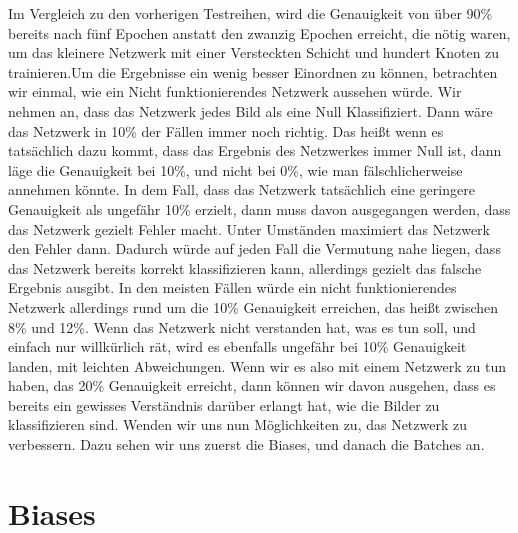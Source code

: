 \documentclass[12pt]{article}
\begin{document}
Im Vergleich zu den vorherigen Testreihen, wird die Genauigkeit von über 90\% bereits nach fünf Epochen anstatt den zwanzig Epochen erreicht, die nötig waren, um das kleinere Netzwerk mit einer Versteckten Schicht und hundert Knoten zu trainieren.Um die Ergebnisse ein wenig besser Einordnen zu können, betrachten wir einmal, wie ein Nicht funktionierendes Netzwerk aussehen würde. Wir nehmen an, dass das Netzwerk jedes Bild als eine Null Klassifiziert. Dann wäre das Netzwerk in 10\% der Fällen immer noch richtig. Das heißt wenn es tatsächlich dazu kommt, dass das Ergebnis des Netzwerkes immer Null ist, dann läge die Genauigkeit bei 10\%, und nicht bei 0\%, wie man fälschlicherweise annehmen könnte. In dem Fall, dass das Netzwerk tatsächlich eine geringere Genauigkeit als ungefähr 10\% erzielt, dann muss davon ausgegangen werden, dass das Netzwerk gezielt Fehler macht. Unter Umständen maximiert das Netzwerk den Fehler dann. Dadurch würde auf jeden Fall die Vermutung nahe liegen, dass das Netzwerk bereits korrekt klassifizieren kann, allerdings gezielt das falsche Ergebnis ausgibt. In den meisten Fällen würde ein nicht funktionierendes Netzwerk allerdings rund um die 10\% Genauigkeit erreichen, das heißt zwischen 8\% und 12\%. Wenn das Netzwerk nicht verstanden hat, was es tun soll, und einfach nur willkürlich rät, wird es ebenfalls ungefähr bei 10\% Genauigkeit landen, mit leichten Abweichungen. Wenn wir es also mit einem Netzwerk zu tun haben, das 20\% Genauigkeit erreicht, dann können wir davon ausgehen, dass es bereits ein gewisses Verständnis darüber erlangt hat, wie die Bilder zu klassifizieren sind. Wenden wir uns nun Möglichkeiten zu, das Netzwerk zu verbessern. Dazu sehen wir uns zuerst die Biases, und danach die Batches an.\section{Biases}
\end{document}
